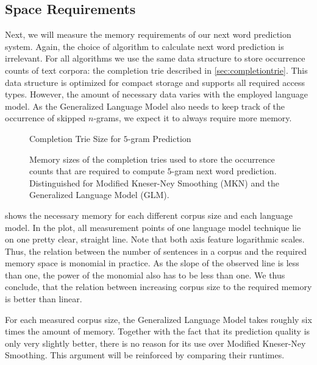 \subsection{Space Requirements}
\label{subsec:evaluation-topkjoin-space}

Next, we will measure the memory requirements of our next word prediction
system.
Again, the choice of algorithm to calculate next word prediction is irrelevant.
For all algorithms we use the same data structure to store occurrence counts of
text corpora: the completion trie described in \cref{sec:completiontrie}.
This data structure is optimized for compact storage and supports all required
access types.
However, the amount of necessary data varies with the employed language model.
As the Generalized Language Model also needs to keep track of the occurrence
of skipped $n$-grams, we expect it to always require more memory.

\begin{figure}
  \centering
  Completion Trie Size for $5$-gram Prediction
  \\[1.5ex]
  \begin{minipage}{0.7\textwidth}
    \centering
    
  \end{minipage}
  \caption{Memory sizes of the completion tries used to store the occurrence
    counts that are required to compute $5$-gram next word prediction.
    Distinguished for Modified Kneser-Ney Smoothing (MKN) and the Generalized
    Language Model (GLM).}
  \label{fig:evaluation-trie-size}
\end{figure}

 shows the necessary memory for each different
corpus size and each language model.
In the plot, all measurement points of one language model technique lie on one
pretty clear, straight line.
Note that both axis feature logarithmic scales.
Thus, the relation between the number of sentences in a corpus and the required
memory space is monomial in practice.
As the slope of the observed line is less than one, the power of the monomial
also has to be less than one.
We thus conclude, that the relation between increasing corpus size to the
required memory is better than linear.

For each measured corpus size, the Generalized Language Model takes roughly
six times the amount of memory.
Together with the fact that its prediction quality is only very slightly better,
there is no reason for its use over Modified Kneser-Ney Smoothing.
This argument will be reinforced by comparing their runtimes.

